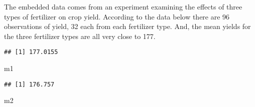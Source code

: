 \documentclass[
]{book}
\newenvironment{Shaded}{\begin{snugshade}}{\end{snugshade}}
\newcommand{\AttributeTok}[1]{\textcolor[rgb]{0.77,0.63,0.00}{#1}}
\newcommand{\ConstantTok}[1]{\textcolor[rgb]{0.00,0.00,0.00}{#1}}
\newcommand{\DecValTok}[1]{\textcolor[rgb]{0.00,0.00,0.81}{#1}}
\newcommand{\FunctionTok}[1]{\textcolor[rgb]{0.00,0.00,0.00}{#1}}
\newcommand{\NormalTok}[1]{#1}
\newcommand{\OtherTok}[1]{\textcolor[rgb]{0.56,0.35,0.01}{#1}}
\newcommand{\SpecialCharTok}[1]{\textcolor[rgb]{0.00,0.00,0.00}{#1}}
\newcommand{\StringTok}[1]{\textcolor[rgb]{0.31,0.60,0.02}{#1}}
\begin{document}
The embedded data comes from an experiment examining the effects of three types of fertilizer on crop yield. According to the data below there are 96 observations of yield, 32 each from each fertilizer type. And, the mean yields for the three fertilizer types are all very close to 177.

\begin{Shaded}
\end{Shaded}

\begin{verbatim}
## [1] 177.0155
\end{verbatim}

\begin{Shaded}
\begin{Highlighting}[]
\NormalTok{m1}
\end{Highlighting}
\end{Shaded}

\begin{verbatim}
## [1] 176.757
\end{verbatim}

\begin{Shaded}
\begin{Highlighting}[]
\NormalTok{m2}
\end{Highlighting}
\end{Shaded}
\end{document}
